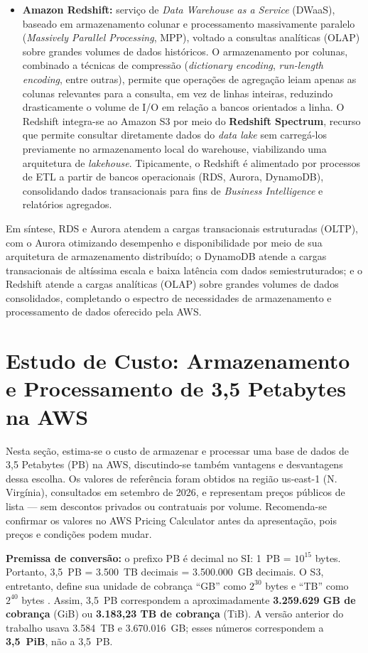 \documentclass[11pt,a4paper]{article}
\begin{document}
\begin{itemize}[leftmargin=*]
    \item \textbf{Amazon Redshift:} serviço de \emph{Data Warehouse as a Service} (DWaaS), baseado em armazenamento colunar e processamento massivamente paralelo (\emph{Massively Parallel Processing}, MPP), voltado a consultas analíticas (OLAP) sobre grandes volumes de dados históricos. O armazenamento por colunas, combinado a técnicas de compressão (\emph{dictionary encoding}, \emph{run-length encoding}, entre outras), permite que operações de agregação leiam apenas as colunas relevantes para a consulta, em vez de linhas inteiras, reduzindo drasticamente o volume de I/O em relação a bancos orientados a linha. O Redshift integra-se ao Amazon S3 por meio do \textbf{Redshift Spectrum}, recurso que permite consultar diretamente dados do \emph{data lake} sem carregá-los previamente no armazenamento local do warehouse, viabilizando uma arquitetura de \emph{lakehouse}. Tipicamente, o Redshift é alimentado por processos de ETL a partir de bancos operacionais (RDS, Aurora, DynamoDB), consolidando dados transacionais para fins de \emph{Business Intelligence} e relatórios agregados.

\end{itemize}

Em síntese, RDS e Aurora atendem a cargas transacionais estruturadas (OLTP), com o Aurora otimizando desempenho e disponibilidade por meio de sua arquitetura de armazenamento distribuído; o DynamoDB atende a cargas transacionais de altíssima escala e baixa latência com dados semiestruturados; e o Redshift atende a cargas analíticas (OLAP) sobre grandes volumes de dados consolidados, completando o espectro de necessidades de armazenamento e processamento de dados oferecido pela AWS.

\clearpage
\section{Estudo de Custo: Armazenamento e Processamento de 3,5 Petabytes na AWS}\label{sec:custo}
Nesta seção, estima-se o custo de armazenar e processar uma base de dados de 3,5 Petabytes (PB) na AWS, discutindo-se também vantagens e desvantagens dessa escolha. Os valores de referência foram obtidos na região us-east-1 (N. Virgínia), consultados em setembro de 2026, e representam preços públicos de lista --- sem descontos privados ou contratuais por volume. Recomenda-se confirmar os valores no AWS Pricing Calculator antes da apresentação, pois preços e condições podem mudar.

\noindent\textbf{Premissa de conversão:} o prefixo PB é decimal no SI: 1~PB = $10^{15}$ bytes. Portanto, 3,5~PB = 3.500~TB decimais = 3.500.000~GB decimais. O S3, entretanto, define sua unidade de cobrança ``GB'' como $2^{30}$ bytes e ``TB'' como $2^{40}$ bytes \cite{s3pricing}. Assim, 3,5~PB correspondem a aproximadamente \textbf{3.259.629 GB de cobrança} (GiB) ou \textbf{3.183,23 TB de cobrança} (TiB). A versão anterior do trabalho usava 3.584~TB e 3.670.016~GB; esses números correspondem a \textbf{3,5~PiB}, não a 3,5~PB.
\end{document}
